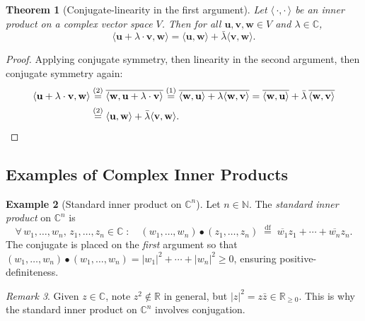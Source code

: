 \documentclass[11pt, a4paper, notitlepage]{report}
\newtheorem{theorem}{Theorem}[section]
\theoremstyle{definition}
\newtheorem{example}[theorem]{Example}
\theoremstyle{remark}
\newtheorem{remark}[theorem]{Remark}
\begin{document}
\begin{theorem}[Conjugate-linearity in the first argument]
\label{thm:complex-ip-conj-linear}
Let $\langle\,\cdot,\cdot\,\rangle$ be an inner product on a complex vector space $V$.
Then for all $\mathbf{u},\mathbf{v},\mathbf{w}\in V$ and $\lambda\in\mathbb{C}$,
\[
  \langle\mathbf{u}+\lambda\cdot\mathbf{v},\mathbf{w}\rangle
  = \langle\mathbf{u},\mathbf{w}\rangle + \bar{\lambda}\langle\mathbf{v},\mathbf{w}\rangle.
\]
\end{theorem}

\begin{proof}
Applying conjugate symmetry, then linearity in the second argument, then conjugate symmetry again:
\begin{align*}
  \langle\mathbf{u}+\lambda\cdot\mathbf{v},\mathbf{w}\rangle
  &\overset{(2)}{=} \overline{\langle\mathbf{w},\mathbf{u}+\lambda\cdot\mathbf{v}\rangle}
   \overset{(1)}{=} \overline{\langle\mathbf{w},\mathbf{u}\rangle + \lambda\langle\mathbf{w},\mathbf{v}\rangle}
   = \overline{\langle\mathbf{w},\mathbf{u}\rangle} + \bar{\lambda}\,\overline{\langle\mathbf{w},\mathbf{v}\rangle}\\
  &\overset{(2)}{=} \langle\mathbf{u},\mathbf{w}\rangle + \bar{\lambda}\langle\mathbf{v},\mathbf{w}\rangle. \qedhere
\end{align*}
\end{proof}

\subsection{Examples of Complex Inner Products}
\label{subsec:complex-ip-examples}

\begin{example}[Standard inner product on $\mathbb{C}^n$]
\label{ex:dot-product-Cn}
Let $n \in \mathbb{N}$. The \emph{standard inner product} on $\mathbb{C}^n$ is
\[
  \forall\,w_1,\ldots,w_n,\,z_1,\ldots,z_n \in \mathbb{C}\;:\quad
  (w_1,\ldots,w_n)\bullet(z_1,\ldots,z_n)
  \;\stackrel{\mathrm{df}}{=}\; \overline{w_1}z_1 + \cdots + \overline{w_n}z_n.
\]
The conjugate is placed on the \emph{first} argument so that
$(w_1,\ldots,w_n)\bullet(w_1,\ldots,w_n) = |w_1|^2 + \cdots + |w_n|^2 \geq 0$,
ensuring positive-definiteness.
\end{example}

\begin{remark}
Given $z \in \mathbb{C}$, note $z^2 \notin \mathbb{R}$ in general, but $|z|^2 = z\bar{z} \in \mathbb{R}_{\geq 0}$.
This is why the standard inner product on $\mathbb{C}^n$ involves conjugation.
\end{remark}
\end{document}

